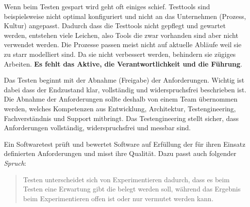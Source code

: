 Wenn beim Testen gespart wird geht oft einiges schief. Testtools sind beispielsweise nicht optimal konfiguriert und nicht an das Unternehmen (Prozess, Kultur) angepasst. Dadurch dass die Testtools nicht gepflegt und gewartet werden, entstehen viele Leichen, also Tools die zwar vorhanden sind aber nicht verwendet werden. Die Prozesse passen meist nicht auf aktuelle Abläufe weil sie zu starr modelliert sind. Da sie nicht verbessert werden, behindern sie zügiges Arbeiten. \textbf{Es fehlt das Aktive, die Verantwortlichkeit und die Führung}.

Das Testen beginnt mit der Abnahme (Freigabe) der Anforderungen. Wichtig ist dabei dass der Endzustand klar, vollständig und widerspruchsfrei beschrieben ist. Die Abnahme der Anforderungen sollte deshalb von einem Team übernommen werden, welches Kompetenzen aus Entwicklung, Architektur, Testengineering, Fachverständnis und Support mitbringt. Das Testengineering stellt sicher, dass Anforderungen vollständig, widerspruchsfrei und messbar sind. 

Ein Softwaretest prüft und bewertet Software auf Erfüllung der für ihren Einsatz definierten Anforderungen und misst ihre Qualität. Dazu passt auch folgender \textit{Spruch}:
\begin{quote}
	Testen unterscheidet sich von Experimentieren dadurch, dass es beim Testen eine Erwartung gibt die belegt werden soll, während das Ergebnis beim Experimentieren offen ist oder nur vermutet werden kann.
\end{quote}

